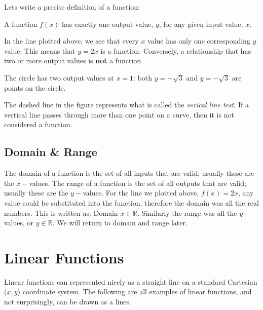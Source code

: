 Lets write a precise definition of a function:
\begin{tcolorbox}
	A function $f(x)$ has exactly one output value, $y$, for any given input value, $x$.
\end{tcolorbox}
In the line plotted above, we see that every $x$ value has only one corresponding $y$ value. This means that $y=2x$ is a function. Conversely, a relationship that has two or more output values is \textbf{not} a function. \\ 
\begin{multicols}{2}
	\begin{center}
	\end{center}
\columnbreak
The circle has two output values at $x=1$: both $y=+\sqrt{3}$ and $y=-\sqrt{3}$ are points on the circle.

The dashed line in the figure represents what is called the \textit{verical line test}. If a vertical line passes through more than one point on a curve, then it is not considered a function.

\subsection*{Domain \& Range}
The domain of a function is the set of all inputs that are valid; usually these are the $x-$values. The range of a function is the set of all outputs that are valid; usually these are the $y-$values. For the line we plotted above, $f(x)=2x$, any value could be substituted into the function, therefore the domain was all the real numbers. This is written as: Domain $x \in \mathbb{R}$. Similarly the range was all the $y-$values, or  $y \in \mathbb{R}$. We will return to domain and range later.
\end{multicols}

\section*{Linear Functions}
Linear functions can represented nicely as a straight line on a standard Cartesian ($x,y$) coordinate system. The following are all examples of linear functions, and not surprisingly, can be drawn as a lines.


